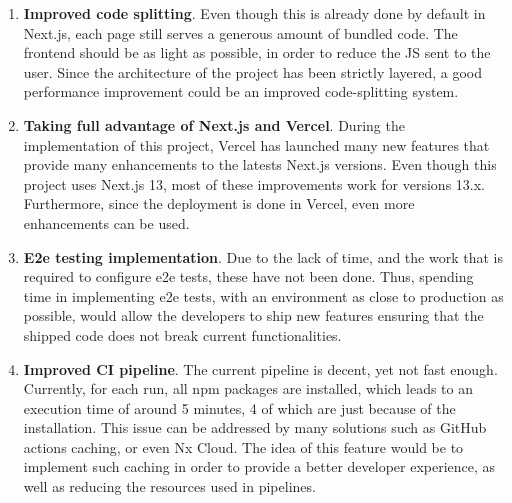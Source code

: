 \documentclass[../memory.tex]{subfiles}
\begin{document}
\begin{enumerate}
	\item\textbf{Improved code splitting}. Even though this is already done by
	default in Next.js, each page still serves a generous amount of bundled
	code. The frontend should be as light as possible, in order to reduce the JS
	sent to the user. Since the architecture of the project has been strictly
	layered, a good performance improvement could be an improved code-splitting
	system.
	\item\textbf{Taking full advantage of Next.js and Vercel}. During the
	implementation of this project, Vercel has launched many new features that
	provide many enhancements to the latests Next.js versions. Even though this
	project uses Next.js 13, most of these improvements work for versions 13.x.
	Furthermore, since the deployment is done in Vercel, even more enhancements
	can be used.
	\item\textbf{E2e testing implementation}. Due to the lack of time, and the
	work that is required to configure e2e tests, these have not been done.
	Thus, spending time in implementing e2e tests, with an environment as close
	to production as possible, would allow the developers to ship new features
	ensuring that the shipped code does not break current functionalities.
	\item\textbf{Improved CI pipeline}. The current pipeline is decent, yet
	not fast enough. Currently, for each run, all npm packages are installed,
	which leads to an execution time of around 5 minutes, 4 of which are just
	because of the installation. This issue can be addressed by many solutions
	such as GitHub actions caching, or even Nx Cloud. The idea of this feature
	would be to implement such caching in order to provide a better developer
	experience, as well as reducing the resources used in pipelines.
\end{enumerate}
\end{document}

